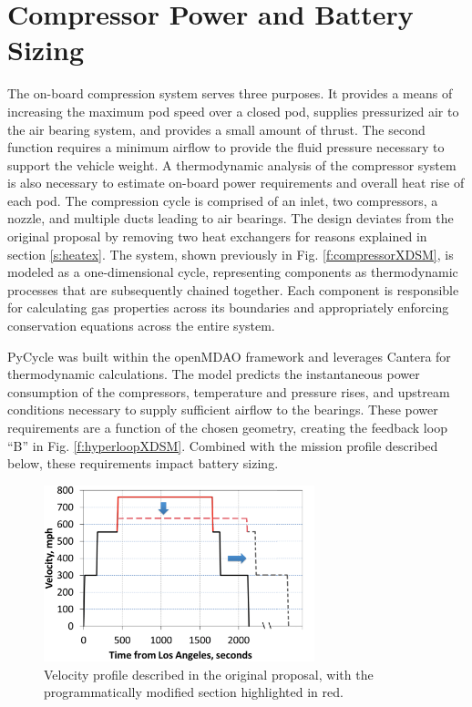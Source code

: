 \documentclass[heading.tex]{subfiles}
\begin{document}
\section{Compressor Power and Battery Sizing}
\label{sec:compressor-and-battery}

The on-board compression system serves three purposes.
It provides a means of increasing the maximum pod speed over a closed pod, supplies pressurized air to the air bearing system,
and provides a small amount of thrust.
The second function requires a minimum airflow to provide the fluid pressure necessary to support the vehicle weight.
A thermodynamic analysis of the compressor system is also necessary to
estimate on-board power requirements and overall heat rise of each pod.
The compression cycle is comprised of an inlet, two compressors, a nozzle, and multiple ducts leading to air bearings.
The design deviates from the original proposal by removing two heat exchangers for reasons explained in section \ref{s:heatex}.
The system, shown previously in Fig. \ref{f:compressorXDSM}, is modeled as a one-dimensional cycle,
representing components as thermodynamic processes that are subsequently chained together.
Each component is responsible for calculating gas properties across its boundaries
and appropriately enforcing conservation equations across the entire system.

PyCycle was built within the openMDAO framework and leverages Cantera \cite{goodwin2009cantera} for thermodynamic calculations.
The model predicts the instantaneous power consumption of the compressors, temperature and pressure rises,
and upstream conditions necessary to supply sufficient airflow to the bearings.
These power requirements are a function of the chosen geometry, creating the feedback loop “B” in Fig. \ref{f:hyperloopXDSM}.
Combined with the mission profile described below, these requirements impact battery sizing.

\begin{figure}[hbtp]
\centering
\includegraphics[width=0.7\textwidth]{images/velocity_profile3.png}
\caption{Velocity profile described in the original proposal, with the programmatically modified section highlighted in red.}
\label{f:velocity}
\end{figure}
\end{document}
